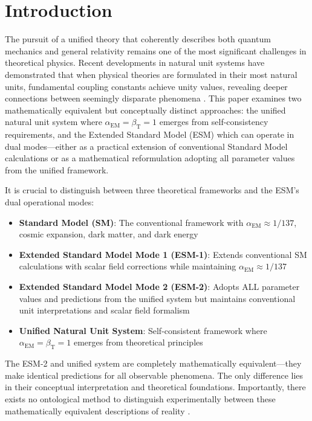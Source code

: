 \documentclass[12pt,a4paper]{article}
\newcommand{\alphaEM}{\alpha_{\text{EM}}}
\newcommand{\betaT}{\beta_{\text{T}}}
\begin{document}
	\section{Introduction}
	\label{sec:introduction}
	
	The pursuit of a unified theory that coherently describes both quantum mechanics and general relativity remains one of the most significant challenges in theoretical physics. Recent developments in natural unit systems have demonstrated that when physical theories are formulated in their most natural units, fundamental coupling constants achieve unity values, revealing deeper connections between seemingly disparate phenomena \cite{pascher_unified_2025}. This paper examines two mathematically equivalent but conceptually distinct approaches: the unified natural unit system where $\alphaEM = \betaT = 1$ emerges from self-consistency requirements, and the Extended Standard Model (ESM) which can operate in dual modes—either as a practical extension of conventional Standard Model calculations or as a mathematical reformulation adopting all parameter values from the unified framework.
	
	It is crucial to distinguish between three theoretical frameworks and the ESM's dual operational modes:
	
	\begin{itemize}
		\item \textbf{Standard Model (SM)}: The conventional framework with $\alphaEM \approx 1/137$, cosmic expansion, dark matter, and dark energy \cite{Weinberg1989,PDG2020}
		\item \textbf{Extended Standard Model Mode 1 (ESM-1)}: Extends conventional SM calculations with scalar field corrections while maintaining $\alphaEM \approx 1/137$
		\item \textbf{Extended Standard Model Mode 2 (ESM-2)}: Adopts ALL parameter values and predictions from the unified system but maintains conventional unit interpretations and scalar field formalism
		\item \textbf{Unified Natural Unit System}: Self-consistent framework where $\alphaEM = \betaT = 1$ emerges from theoretical principles \cite{pascher_unified_2025}
	\end{itemize}
	
	The ESM-2 and unified system are completely mathematically equivalent—they make identical predictions for all observable phenomena. The only difference lies in their conceptual interpretation and theoretical foundations. Importantly, there exists no ontological method to distinguish experimentally between these mathematically equivalent descriptions of reality \cite{Duhem1906,Quine1951}.
	
\end{document}
